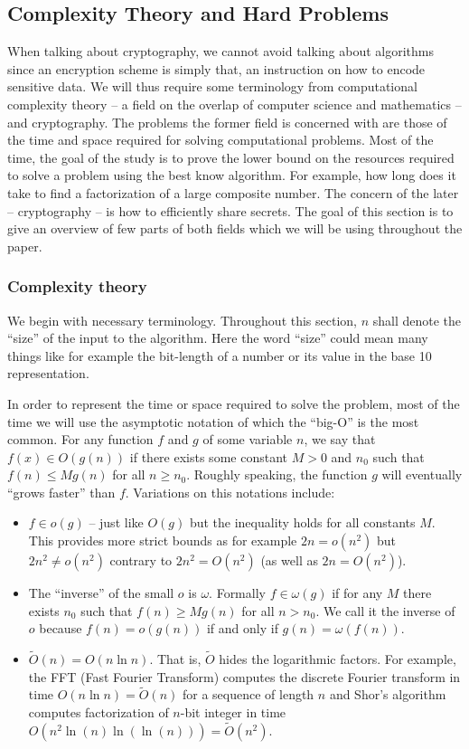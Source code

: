 \subsection{Complexity Theory and Hard Problems} \label{hardness}
When talking about cryptography, we cannot avoid talking about algorithms since an encryption scheme is simply that, an instruction on how to encode sensitive data. We will thus require some terminology from computational complexity theory -- a field on the overlap of computer science and mathematics -- and cryptography. The problems the former field is concerned with are those of the time and space required for solving computational problems. Most of the time, the goal of the study is to prove the lower bound on the resources required to solve a problem using the best know algorithm. For example, how long does it take to find a factorization of a large composite number. The concern of the later -- cryptography -- is how to efficiently share secrets. The goal of this section is to give an overview of few parts of both fields which we will be using throughout the paper. 

\subsubsection*{Complexity theory}
We begin with necessary terminology. Throughout this section, $n$ shall denote the ``size'' of the input to the algorithm. Here the word ``size'' could mean many things like for example the bit-length of a number or its value in the base 10 representation.

In order to represent the time or space required to solve the problem, most of the time we will use the asymptotic notation of which the ``big-O'' is the most common. For any function $f$ and $g$ of some variable $n$, we say that $f(x) \in O(g(n))$ if there exists some constant $M > 0$ and $n_0$ such that $f(n) \leq Mg(n)$ for all $n \geq n_0$. Roughly speaking, the function $g$ will eventually ``grows faster'' than $f$. Variations on this notations include:

\begin{itemize}
	\item $f \in o(g)$ -- just like $O(g)$ but the inequality holds for all constants $M$. This provides more strict bounds as for example $2n = o(n^2)$ but $2n^2 \neq o(n^2)$ contrary to $2n^2 = O(n^2)$ (as well as $2n = O(n^2)$).
	\item The ``inverse'' of the small $o$ is $\omega$. Formally $f \in \omega(g)$ if for any $M$ there exists $n_0$ such that $f(n) \geq Mg(n)$ for all $n > n_0$. We call it the inverse of $o$ because $f(n) = o(g(n))$ if and only if $g(n) = \omega(f(n))$.
	\item $\tilde{O}(n) = O(n \ln n)$. That is, $\tilde{O}$ hides the logarithmic factors. For example, the FFT (Fast Fourier Transform) computes the discrete Fourier transform in time $O(n \ln n) = \tilde{O}(n)$ for a sequence of length $n$ and Shor's algorithm computes factorization of $n$-bit integer in time $O(n^2 \ln(n) \ln(\ln(n))) = \tilde{O}(n^2)$.
\end{itemize}


